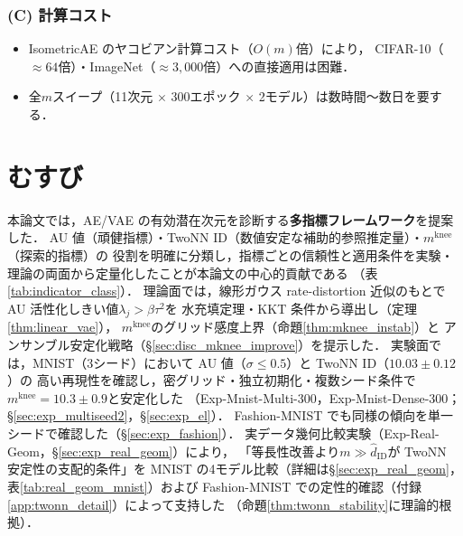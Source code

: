 \documentclass[11pt,a4paper]{jsarticle}
\newcommand{\mknee}{m^{\mathrm{knee}}}
\begin{document}
\subsubsection*{(C) 計算コスト}

\begin{itemize}
  \item IsometricAE のヤコビアン計算コスト（$O(m)$倍）により，
        CIFAR-10（$\approx 64$倍）・ImageNet（$\approx 3{,}000$倍）への直接適用は困難．
  \item 全$m$スイープ（11次元 $\times$ 300エポック $\times$ 2モデル）は数時間〜数日を要する．
\end{itemize}

\section{むすび}\label{sec:conclusion}

本論文では，AE/VAE の有効潜在次元を診断する\textbf{多指標フレームワーク}を提案した．
AU 値（頑健指標）・TwoNN ID（数値安定な補助的参照推定量）・$\mknee$（探索的指標）の
役割を明確に分類し，指標ごとの信頼性と適用条件を実験・理論の両面から定量化したことが本論文の中心的貢献である
（表\ref{tab:indicator_class}）．
理論面では，線形ガウス rate-distortion 近似のもとで AU 活性化しきい値$\lambda_j > \beta\tau^2$を
水充填定理・KKT 条件から導出し（定理\ref{thm:linear_vae}），
$\mknee$のグリッド感度上界（命題\ref{thm:mknee_instab}）と
アンサンブル安定化戦略（§\ref{sec:disc_mknee_improve}）を提示した．
実験面では，MNIST（3シード）において AU 値（$\sigma \leq 0.5$）と TwoNN ID（$10.03 \pm 0.12$）の
高い再現性を確認し，密グリッド・独立初期化・複数シード条件で$\mknee = 10.3 \pm 0.9$と安定化した
（Exp-Mnist-Multi-300，Exp-Mnist-Dense-300；§\ref{sec:exp_multiseed2}，§\ref{sec:exp_el}）．
Fashion-MNIST でも同様の傾向を単一シードで確認した（§\ref{sec:exp_fashion}）．
実データ幾何比較実験（Exp-Real-Geom，§\ref{sec:exp_real_geom}）により，
「等長性改善より$m \gg \hat{d}_\mathrm{ID}$が TwoNN 安定性の支配的条件」を
MNIST の4モデル比較（詳細は§\ref{sec:exp_real_geom}，表\ref{tab:real_geom_mnist}）および
Fashion-MNIST での定性的確認（付録\ref{app:twonn_detail}）によって支持した
（命題\ref{thm:twonn_stability}に理論的根拠）．
\end{document}
